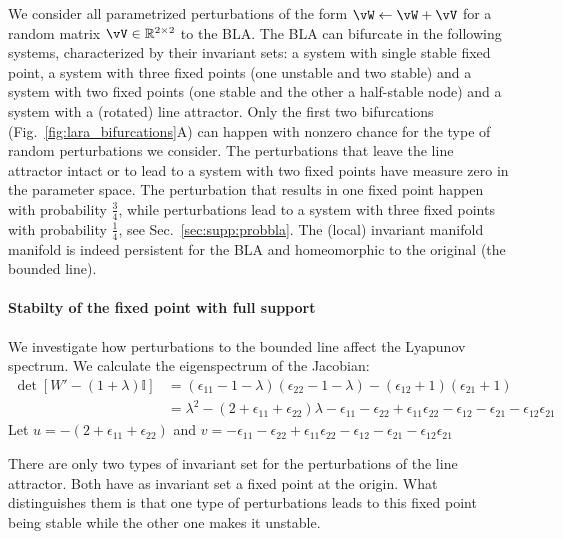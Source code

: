 \documentclass{article} %
\newcounter{ct}
\theoremstyle{definition}
\theoremstyle{remark}
\begin{document}
We consider all parametrized perturbations of the form \( \vW \leftarrow \vW + \vV\) for a random matrix \(\vV\in \mathbb{R}^{2 \times 2}\) to the BLA.
The BLA can bifurcate in the following systems, characterized by their invariant sets: a system with single stable fixed point, a system with three fixed points (one unstable and two stable) and  a system with two fixed points (one stable and the other a half-stable node) and a system with a (rotated) line attractor.
Only the first two bifurcations (Fig.~\ref{fig:lara_bifurcations}A) can happen with nonzero chance for the type of random perturbations we consider.
The perturbations that leave the line attractor intact or to lead to a system with two fixed points have measure zero in the parameter space.
The perturbation that results in one fixed point happen with probability \(\frac{3}{4}\), while perturbations lead to a system with three fixed points with probability \(\frac{1}{4}\), see Sec.~\ref{sec:supp:probbla}.
The (local) %
 invariant manifold manifold is indeed persistent for the BLA and homeomorphic to the original (the bounded line).



\paragraph{Stabilty of the fixed point with full support}
We investigate how perturbations to the bounded line affect the Lyapunov spectrum.
We calculate the eigenspectrum of the Jacobian:
\begin{align*}
\det [W' -(1+\lambda)\mathbb{I}] &= (\epsilon_{11}-1-\lambda)(\epsilon_{22}-1-\lambda)-(\epsilon_{12}+1)(\epsilon_{21}+1)\\
&=\lambda^{2} - (2+\epsilon_{11}+\epsilon_{22})\lambda -\epsilon_{11}-\epsilon_{22}+\epsilon_{11}\epsilon_{22} -\epsilon_{12} - \epsilon_{21} - \epsilon_{12}\epsilon_{21}
\end{align*}
Let
\(u=- (2+\epsilon_{11}+\epsilon_{22})\)
and
\(v=-\epsilon_{11}-\epsilon_{22}+\epsilon_{11}\epsilon_{22} -\epsilon_{12} - \epsilon_{21} - \epsilon_{12}\epsilon_{21}\)

There are only two types of invariant set for the perturbations of the line attractor. Both have as invariant set a fixed point at the origin. What distinguishes them is that one type of perturbations leads to this fixed point being stable while the other one makes it unstable.
\end{document}
